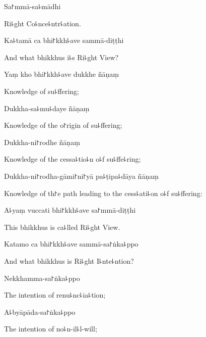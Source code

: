Sa꜓mmā-sa꜕mādhi

\begin{english}
  Ri꜕ght Co꜕nce꜕ntr꜕ation.
\end{english}

Ka꜕tamā ca bhi꜓kkh꜕ave sammā-diṭṭhi

\begin{english}
  And what bhikkhus i꜕s Ri꜕ght View?
\end{english}

Yaṃ kho bhi꜓kkh꜕ave dukkhe ñāṇaṃ

\begin{english}
  Knowledge of su꜕ffering;
\end{english}

Dukkha-sa꜕mu꜕daye ñāṇaṃ

\begin{english}
  Knowledge of the o꜓rigin of su꜕ffering;
\end{english}

Dukkha-ni꜓rodhe ñāṇaṃ

\begin{english}
  Knowledge of the cessa꜕tio꜕n o꜕f su꜕ffe꜕ring;
\end{english}

Dukkha-ni꜓rodha-gāmi꜓ni꜓yā pa꜕ṭipa꜕dāya ñāṇaṃ

\begin{english}
  Knowledge of th꜓e path leading to the cess꜕ati꜕on o꜕f su꜕ffering:
\end{english}

A꜕yaṃ vuccati bhi꜓kkh꜕ave sa꜓mmā-diṭṭhi

\begin{english}
  This bhikkhus is ca꜕lled Ri꜕ght View.
\end{english}

Katamo ca bhi꜓kkh꜕ave sammā-sa꜓ṅka꜕ppo

\begin{english}
  And what bhikkhus is Ri꜕ght I꜕nte꜕ntion?
\end{english}

Nekkhamma-sa꜓ṅka꜕ppo

\begin{english}
  The intention of renu꜕nc꜕ia꜕tion;
\end{english}

A꜕byāpāda-sa꜓ṅka꜕ppo

\begin{english}
  The intention of no꜕n-il꜕l-will;
\end{english}

